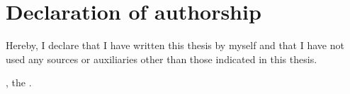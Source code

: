\chapter*{Declaration of authorship}
\thispagestyle{empty}

\noindent Hereby, I declare that I have written this thesis by myself and that I have not used any sources or auxiliaries other than those indicated in this thesis.

\vspace*{1cm}

\noindent \getPrintLocationEN, the \getSubmissionDateEN.

\vspace*{2cm}
\par\noindent\makebox[2.5in]{\hspace*{-1pt}\dotfill}
\par\noindent\makebox[2.5in][l]{\getAuthor}
